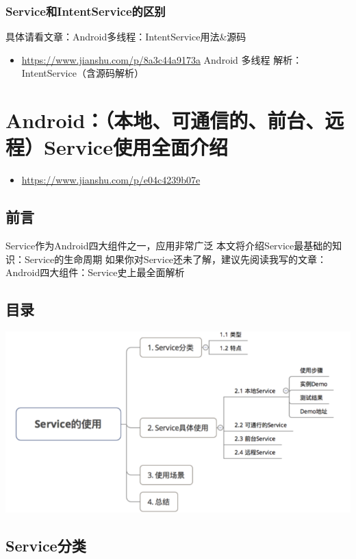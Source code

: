 \documentclass[9pt, b5paper]{article}
\begin{document}
\subsubsection{Service和IntentService的区别}
\label{sec-2-7-2}
具体请看文章：Android多线程：IntentService用法\&源码
\begin{itemize}
\item \url{https://www.jianshu.com/p/8a3c44a9173a} Android 多线程 解析：IntentService（含源码解析）
\end{itemize}


\section{Android：（本地、可通信的、前台、远程）Service使用全面介绍}
\label{sec-3}
\begin{itemize}
\item \url{https://www.jianshu.com/p/e04c4239b07e}
\end{itemize}
\subsection{前言}
\label{sec-3-1}
Service作为Android四大组件之一，应用非常广泛
本文将介绍Service最基础的知识：Service的生命周期
如果你对Service还未了解，建议先阅读我写的文章：
Android四大组件：Service史上最全面解析
\subsection{目录}
\label{sec-3-2}

\includegraphics[width=.9\linewidth]{./pic/service2.png}
\subsection{Service分类}
\label{sec-3-3}
\end{document}
